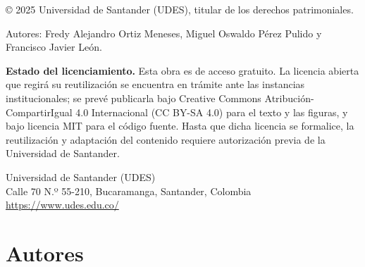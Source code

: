 \documentclass[
  spanish,
  letterpaper,
  DIV=11,
  numbers=noendperiod]{scrreprt}
\begin{document}
\begin{tcolorbox}[enhanced jigsaw, colback=white, breakable, toptitle=1mm, toprule=.15mm, colbacktitle=quarto-callout-note-color!10!white, bottomrule=.15mm, coltitle=black, titlerule=0mm, opacityback=0, leftrule=.75mm, bottomtitle=1mm, colframe=quarto-callout-note-color-frame, left=2mm, title=\textcolor{quarto-callout-note-color}{\faInfo}\hspace{0.5em}{Derechos de autor y licencia}, rightrule=.15mm, opacitybacktitle=0.6, arc=.35mm]

© 2025 Universidad de Santander (UDES), titular de los derechos
patrimoniales.

Autores: Fredy Alejandro Ortiz Meneses, Miguel Oswaldo Pérez Pulido y
Francisco Javier León.

\textbf{Estado del licenciamiento.} Esta obra es de acceso gratuito. La
licencia abierta que regirá su reutilización se encuentra en trámite
ante las instancias institucionales; se prevé publicarla bajo Creative
Commons Atribución-CompartirIgual 4.0 Internacional (CC BY-SA 4.0) para
el texto y las figuras, y bajo licencia MIT para el código fuente. Hasta
que dicha licencia se formalice, la reutilización y adaptación del
contenido requiere autorización previa de la Universidad de Santander.

Universidad de Santander (UDES)\\
Calle 70 N.º 55-210, Bucaramanga, Santander, Colombia\\
\url{https://www.udes.edu.co/}

\end{tcolorbox}


\chapter{Autores}\label{autores}
\end{document}
